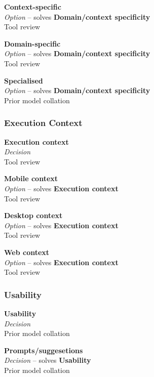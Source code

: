 \textbf{Context-specific} \\ \emph{Option} -- solves \textbf{Domain/context specificity} \\ Tool review

\textbf{Domain-specific} \\ \emph{Option} -- solves \textbf{Domain/context specificity} \\ Tool review

\textbf{Specialised} \\ \emph{Option} -- solves \textbf{Domain/context specificity} \\ Prior model collation \cite{Aghaee2012}


\subsubsection{Execution Context}

\textbf{Execution context} \\ \emph{Decision} \\ Tool review

\textbf{Mobile context} \\ \emph{Option} -- solves \textbf{Execution context} \\ Tool review

\textbf{Desktop context} \\ \emph{Option} -- solves \textbf{Execution context} \\ Tool review

\textbf{Web context} \\ \emph{Option} -- solves \textbf{Execution context} \\ Tool review

\subsubsection{Usability}

\textbf{Usability} \\ \emph{Decision} \\ Prior model collation \cite{Aghaee2012}

\textbf{Prompts/suggesetions} \\ \emph{Decision} -- solves \textbf{Usability} \\ Prior model collation \cite{Minhas2012}

